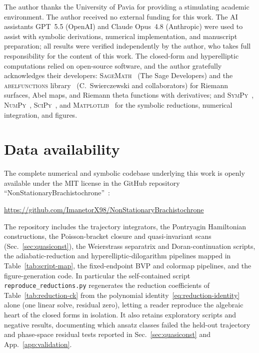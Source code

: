 \documentclass[12pt]{iopart}
\begin{document}
\ack
The author thanks the University of Pavia for providing a stimulating academic
environment. The author received no external funding for this work. The AI
assistants GPT~5.5 (OpenAI) and Claude Opus~4.8 (Anthropic) were used to assist with
symbolic derivations, numerical implementation, and manuscript preparation; all
results were verified independently by the author, who takes full responsibility
for the content of this work. The closed-form and hyperelliptic computations relied
on open-source software, and the author gratefully acknowledges their developers:
\textsc{SageMath}~\cite{SageMath} (The Sage Developers) and the
\textsc{abelfunctions} library~\cite{abelfunctions} (C.~Swierczewski and
collaborators) for Riemann surfaces, Abel maps, and Riemann theta functions with
derivatives; and \textsc{SymPy}~\cite{SymPy}, \textsc{NumPy}~\cite{NumPy},
\textsc{SciPy}~\cite{SciPy}, and \textsc{Matplotlib}~\cite{Matplotlib} for the
symbolic reductions, numerical integration, and figures.

\section*{Data availability}
The complete numerical and symbolic codebase underlying this work is openly
available under the MIT license in the GitHub repository
``NonStationary\-Brachi\-sto\-chrone''~\cite{Rosignoli2026Code}:
\begin{center}
\url{https://github.com/ImanetorX98/NonStationaryBrachistochrone}
\end{center}
The repository includes the trajectory integrators, the Pontryagin Hamiltonian
constructions, the Poisson-bracket closure and quasi-invariant scans
(Sec.~\ref{sec:quasiconst}), the Weierstrass separatrix and Doran-continuation
scripts, the adiabatic-reduction and hyperelliptic-dilogarithm pipelines mapped in
Table~\ref{tab:script-map}, the fixed-endpoint BVP and colormap pipelines, and the
figure-generation code. In particular the self-contained script
\texttt{reproduce\_reductions.py} regenerates the reduction coefficients of
Table~\ref{tab:reduction-ck} from the polynomial
identity~\eqref{eq:reduction-identity} alone (one linear solve, residual zero),
letting a reader reproduce the algebraic heart of the closed forms in isolation. It
also retains exploratory scripts and negative results,
documenting which ansatz classes failed the held-out trajectory and phase-space
residual tests reported in Sec.~\ref{sec:quasiconst} and
App.~\ref{app:validation}.
\end{document}
